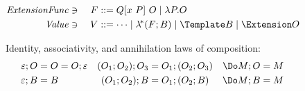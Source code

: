 \documentclass[runningheads]{llncs}
\begin{document}
\begin{figure}
\centering

\begin{alignat*}{2}
  \mathit{ExtensionFunc} &\ni{}& F
  &::= Q[x ~ P] ~ O
  \mid \lambda P. O
  \\
  \mathit{Value} &\ni{}& V
  &::= \dots
  \mid \lamstar (F; B)
  \mid \Template B
  \mid \Extension O
  \\
\end{alignat*}

Identity, associativity, and annihilation laws of composition:
\begin{align*}
  \varepsilon; O &= O = O; \varepsilon
  &
  (O_1; O_2); O_3 &= O_1; (O_2; O_3)
  &
  \Do M; O &= \do M
  \\
  \varepsilon; B &= B
  &
  (O_1; O_2); B &= O_1; (O_2; B)
  &
  \Do M; B &= \do M
\end{align*}




\end{figure}
\end{document}
